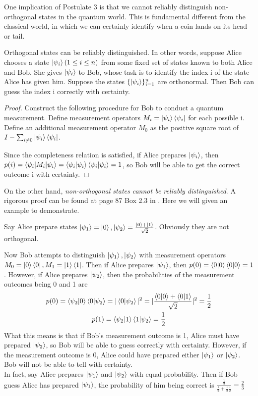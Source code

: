 \bigskip
One implication of Postulate 3 is that we cannot reliably distinguish non-orthogonal states in the quantum world. This is fundamental different from the classical world, in which we can certainly identify when a coin lands on its head or tail. 

\begin{theorem} \label{theorem-distinguishing orthogonal states}
Orthogonal states can be reliably distinguished. In other words, suppose Alice chooses a state $\ket{\psi_i} (1 \le i \le n)$ from some fixed set of states known to both Alice and Bob. She gives $\ket{\psi_i}$ to Bob, whose task is to identify the index i of the state Alice has given him. Suppose the states $\{\ket{\psi_i}\}_{i=1}^n$ are orthonormal. Then Bob can guess the index i correctly with certainty.
\end{theorem}
\begin{proof}
Construct the following procedure for Bob to conduct a quantum measurement.
Define measurement operators $M_i=\ket{\psi_i}\bra{\psi_i}$ for each possible i. Define an additional measurement operator $M_0$ as the positive square root of $I-\sum_{i \ne 0} \ket{\psi_i}\bra{\psi_i}$.

Since the completeness relation is satisfied, if Alice prepares $\ket{\psi_i}$, then $p(i)=\braket{\psi_i | M_i |\psi_i}=\braket{\psi_i |\psi_i}\braket{\psi_i |\psi_i}=1$, so Bob will be able to get the correct outcome i with certainty.
\end{proof}

On the other hand, \textit{non-orthogonal states cannot be reliably distinguished}. A rigorous proof can be found at page 87 Box 2.3 in \cite{Nielsen}. Here we will given an example to demonstrate.
\begin{example}
Say Alice prepare states $\ket{\psi_1}=\ket{0}, \ket{\psi_2}=\frac{\ket{0}+\ket{1}}{\sqrt{2}}$. Obviously they are not orthogonal.

Now Bob attempts to distinguish $\ket{\psi_1}, \ket{\psi_2}$ with measurement operators $M_0=\ket{0}\bra{0}, M_1=\ket{1}\bra{1}$. Then if Alice prepares $\ket{\psi_1}$, then $p(0)=\braket{0 |0}\braket{0|0}=1$. However, if Alice prepares $\ket{\psi_2}$, then the probabilities of the measurement outcomes being 0 and 1 are
\begin{gather*}
    p(0)=\braket{\psi_2|0}\braket{0|\psi_2}=|\braket{0|\psi_2}|^2=|\frac{\braket{0|0}+\braket{0|1}}{\sqrt{2}}|^2=\frac{1}{2}\\
    p(1)=\braket{\psi_2|1}\braket{1|\psi_2}=\frac{1}{2}
\end{gather*}
What this means is that if Bob's measurement outcome is 1, Alice must have prepared $\ket{\psi_2}$, so Bob will be able to guess correctly with certainty. However, if the measurement outcome is 0, Alice could have prepared either $\ket{\psi_1}$ or $\ket{\psi_2}$.
Bob will not be able to tell with certainty.\\
In fact, say Alice prepares $\ket{\psi_1}$ and $\ket{\psi_2}$ with equal probability. Then if Bob guess Alice has prepared $\ket{\psi_1}$, the probability of him being correct is $\frac{\frac{1}{2}}{\frac{1}{2}+\frac{1}{2}\frac{1}{2}}=\frac{2}{3}$
\end{example}

